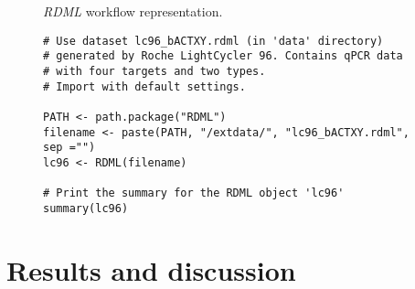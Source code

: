 \documentclass{bioinfo}
\begin{document}
\begin{figure*}
	\caption[]{\textit{RDML} workflow representation.}
	\label{fig:RDMLworkflow}
\end{figure*}

\begin{figure*}
\begin{verbatim}
# Use dataset lc96_bACTXY.rdml (in 'data' directory)
# generated by Roche LightCycler 96. Contains qPCR data
# with four targets and two types.
# Import with default settings.

PATH <- path.package("RDML")
filename <- paste(PATH, "/extdata/", "lc96_bACTXY.rdml", sep ="")
lc96 <- RDML(filename)

# Print the summary for the RDML object 'lc96'
summary(lc96)
\end{verbatim}
\end{figure*}


\section{Results and discussion}

%
%
%
%
%
%

%

\end{document}
